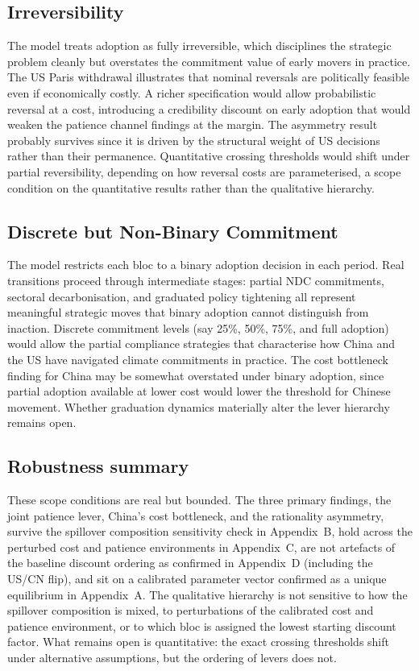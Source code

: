 \documentclass[10pt,a4paper]{article}
\begin{document}
\subsection{Irreversibility}

The model treats adoption as fully irreversible, which disciplines the strategic
problem cleanly but overstates the commitment value of early movers in practice. The US Paris withdrawal
illustrates that nominal reversals are politically feasible even if economically costly. A richer specification
would allow probabilistic reversal at a cost, introducing a credibility discount on early adoption that
would weaken the patience channel findings at the margin. The asymmetry result probably survives since it is driven by the structural weight of US decisions rather than their permanence. Quantitative crossing thresholds would shift under partial reversibility, depending on how reversal costs are parameterised, a scope condition on the quantitative results rather than the qualitative hierarchy.

\subsection{Discrete but Non-Binary Commitment}

The model restricts each bloc to a binary adoption decision in each period. Real transitions proceed through intermediate stages: partial NDC commitments, sectoral decarbonisation, and graduated policy tightening all represent meaningful strategic moves that binary adoption cannot distinguish from inaction. Discrete commitment levels (say 25\%, 50\%, 75\%, and full adoption) would allow the partial compliance strategies that characterise how China and the US have navigated climate commitments in practice. The cost bottleneck finding for China may be somewhat overstated under binary adoption, since partial adoption available at lower cost would lower the threshold for Chinese movement. Whether graduation dynamics materially alter the lever hierarchy remains open.

\needspace{5em}
\subsection{Robustness summary}

These scope conditions are real but bounded. The three primary findings, the joint patience lever,
China's cost bottleneck, and the rationality asymmetry, survive the spillover composition sensitivity
check in Appendix~B, hold across the perturbed cost and patience environments in Appendix~C, are not
artefacts of the baseline discount ordering as confirmed in Appendix~D (including the US/CN flip),
and sit on a calibrated parameter vector confirmed as a unique equilibrium in Appendix~A. The
qualitative hierarchy is not sensitive to how the spillover composition is mixed, to perturbations
of the calibrated cost and patience environment, or to which bloc is assigned the lowest starting
discount factor. What remains open is quantitative: the exact crossing thresholds shift under alternative
assumptions, but the ordering of levers does not.
\end{document}
